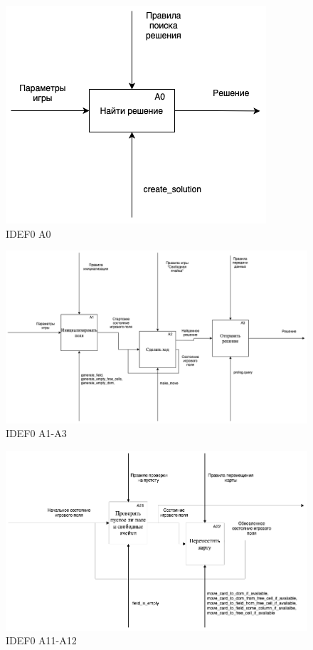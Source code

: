 \documentclass[12pt]{report}
\begin{document}
\begin{figure}[H]
    	\begin{center}
    		\includegraphics[scale=1]{idef_1.png}
    		\caption{IDEF0 A0}
    	\end{center}
\end{figure}

\begin{figure}[H]
    	\begin{center}
    		\includegraphics[scale=0.45]{idef_2.png}
    		\caption{IDEF0 A1-A3}
    	\end{center}
\end{figure}

\begin{figure}[H]
    	\begin{center}
    		\includegraphics[scale=0.45]{idef_3.png}
    		\caption{IDEF0 A11-A12}
    	\end{center}
\end{figure}
\end{document}
